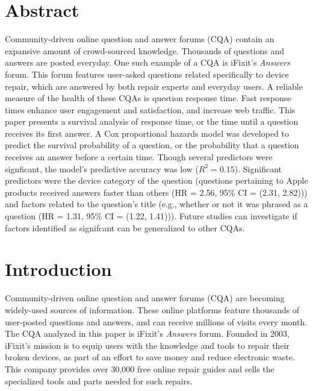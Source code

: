\documentclass{article}
\begin{document}




\section*{Abstract}

Community-driven online question and answer forums (CQA) contain an expansive amount of crowd-sourced knowledge. Thousands of questions and answers are posted everyday. One such example of a CQA is iFixit's \textit{Answers} forum. This forum features user-asked questions related specifically to device repair, which are answered by both repair experts and everyday users. A reliable measure of the health of these CQAs is question response time. Fast response times enhance user engagement and satisfaction, and increase web traffic. This paper presents a survival analysis of response time, or the time until a question receives its first answer. A Cox proportional hazards model was developed to predict the survival probability of a question, or the probability that a question receives an answer before a certain time. Though several predictors were signficant, the model's predictive accuracy was low ($R^2 = 0.15$). Significant predictors were the device category of the question (questions pertaining to Apple products received answers faster than others (HR = 2.56, 95\% CI = (2.31, 2.82))) and factors related to the question's title (e.g., whether or not it was phrased as a question (HR = 1.31, 95\% CI = (1.22, 1.41))). Future studies can investigate if factors identified as signifcant can be generalized to other CQAs. 


\section*{Introduction}

Community-driven online question and answer forums (CQA) are becoming widely-used sources of information. These online platforms feature thousands of user-posted questions and answers, and can receive millions of visits every month. The CQA analyzed in this paper is iFixit's \textit{Answers} forum. Founded in 2003, iFixit's mission is to equip users with the knowledge and tools to repair their broken devices, as part of an effort to save money and reduce electronic waste. This company provides over 30,000 free online repair guides and sells the specialized tools and parts needed for such repairs.
    
\end{document}
